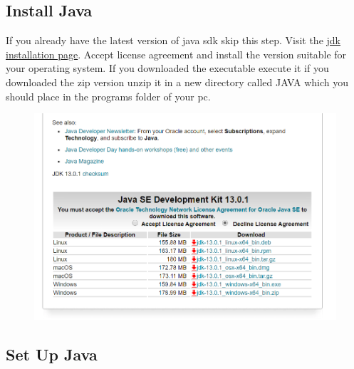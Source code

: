 \subsection{Install Java}
If you already have the latest version of java sdk skip this step.
Visit the \href{https://www.oracle.com/technetwork/java/javase/downloads/jdk13-downloads-5672538.html}{jdk installation page}.
Accept license agreement and install the version suitable for your operating system.
If you downloaded the executable execute it if you downloaded the zip version unzip it in a new directory called JAVA which you should place in the programs folder of your pc. 
\begin{figure}[h]
\centering
\includegraphics[width=\textwidth]{Images/javaVersionchoice.png}
\end{figure} 
\clearpage

\subsection{Set Up Java}

